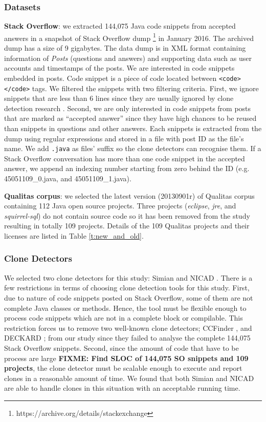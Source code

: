 \documentclass{sig-alternate-05-2015}
\newcommand\FIXME[1]{\textbf{FIXME: #1}}
\begin{document}
\subsubsection{Datasets}
\textbf{Stack Overflow}: we extracted 144,075 Java code snippets from accepted answers in a snapshot of Stack Overflow dump \footnote{https://archive.org/details/stackexchange} in January 2016. The archived dump has a size of 9 gigabytes. The data dump is in XML format containing information of \textit{Posts} (questions and answers) and supporting data such as user accounts and timestamps of the posts. We are interested in code snippets embedded in posts. Code snippet is a piece of code located between \texttt{<code></code>} tags. We filtered the snippets with two filtering criteria. First, we ignore snippets that are less than 6 lines since they are usually ignored by clone detection research \cite{something}. Second, we are only interested in code snippets from posts that are marked as ``accepted answer'' since they have high chances to be reused than snippets in questions and other answers. Each snippets is extracted from the dump using regular expressions and stored in a file with post ID as the file's name. We add \texttt{.java} as files' suffix so the clone detectors can recognise them. If a Stack Overflow conversation has more than one code snippet in the accepted answer, we append an indexing number starting from zero behind the ID (e.g. 45051109\_0.java, and 45051109\_1.java).

\textbf{Qualitas corpus}: we selected the latest version (20130901r) of Qualitas corpus \cite{QualitasCorpus} containing 112 Java open source projects. Three projects (\textit{eclipse}, \textit{jre}, and \textit{squirrel-sql}) do not contain source code so it has been removed from the study resulting in totally 109 projects. Details of the 109 Qualitas projects and their licenses are listed in Table \ref{t:new_and_old}.

\subsubsection{Clone Detectors}
We selected two clone detectors for this study: Simian \cite{simian} and NICAD \cite{Cordy,Roy2008}. There is a few restrictions in terms of choosing clone detection tools for this study. First, due to nature of code snippets posted on Stack Overflow, some of them are not complete Java classes or methods. Hence, the tool must be flexible enough to process code snippets which are not in a complete block or compilable. This restriction forces us to remove two well-known clone detectors; CCFinder \cite{Kamiya2002}, and DECKARD \cite{Jiang2007a}; from our study since they failed to analyse the complete 144,075 Stack Overflow snippets. Second, since the amount of code that have to be process are large \FIXME{Find SLOC of 144,075 SO snippets and 109 projects}, the clone detector must be scalable enough to execute and report clones in a reasonable amount of time. We found that both Simian and NICAD are able to handle clones in this situation with an acceptable running time.
\end{document}
